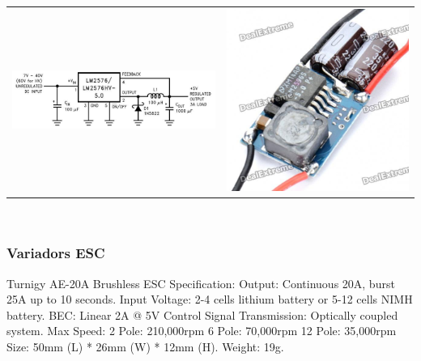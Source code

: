 \documentclass[twoside]{article}
\begin{document}
\begin{tabular}{m{10cm}m{6cm}}
\includegraphics[scale=0.55]{images/lm2576s.jpeg} &
\includegraphics[scale=0.12]{images/regulator.jpg}
\end{tabular}\\

\subsubsection*{Variadors ESC}
Turnigy AE-20A Brushless ESC
Specification:
Output:  Continuous 20A, burst 25A up to 10 seconds.
Input Voltage:  2-4 cells lithium battery or 5-12 cells NIMH battery.   
BEC:  Linear 2A @ 5V
Control Signal Transmission: Optically coupled system.
Max Speed:     
   2 Pole: 210,000rpm
   6 Pole: 70,000rpm
   12 Pole: 35,000rpm
Size:  50mm (L) * 26mm (W) * 12mm (H).
Weight:  19g.
\end{document}
